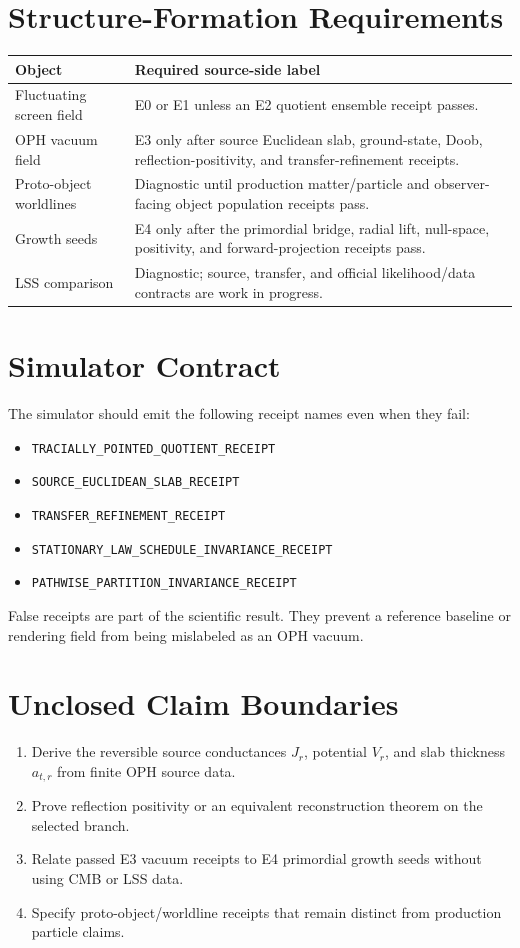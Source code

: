 \documentclass[11pt]{article}
\theoremstyle{remark}
\theoremstyle{plain}
\newcommand{\pathref}[1]{\nolinkurl{#1}}
\begin{document}
\section{Structure-Formation Requirements}

\begin{longtable}{@{}p{}p{}@{}}
\toprule
Object & Required source-side label\\
\midrule
\endhead
\bottomrule
\endfoot
Fluctuating screen field & E0 or E1 unless an E2 quotient ensemble receipt passes.\\
OPH vacuum field & E3 only after source Euclidean slab, ground-state, Doob, reflection-positivity,
and transfer-refinement receipts.\\
Proto-object worldlines & Diagnostic until production matter/particle and observer-facing object
population receipts pass.\\
Growth seeds & E4 only after the primordial bridge, radial lift, null-space, positivity, and
forward-projection receipts pass.\\
LSS comparison & Diagnostic; source, transfer, and official likelihood/data contracts are work in progress.\\
\end{longtable}

\section{Simulator Contract}

The simulator should emit the following receipt names even when they fail:
\begin{itemize}[leftmargin=2em]
\item \pathref{TRACIALLY_POINTED_QUOTIENT_RECEIPT}
\item \pathref{SOURCE_EUCLIDEAN_SLAB_RECEIPT}
\item \pathref{TRANSFER_REFINEMENT_RECEIPT}
\item \pathref{STATIONARY_LAW_SCHEDULE_INVARIANCE_RECEIPT}
\item \pathref{PATHWISE_PARTITION_INVARIANCE_RECEIPT}
\end{itemize}
False receipts are part of the scientific result.  They prevent a reference baseline or rendering
field from being mislabeled as an OPH vacuum.

\section{Unclosed Claim Boundaries}

\begin{enumerate}[leftmargin=2em]
\item Derive the reversible source conductances \(J_r\), potential \(V_r\), and slab thickness
\(a_{t,r}\) from finite OPH source data.
\item Prove reflection positivity or an equivalent reconstruction theorem on the selected branch.
\item Relate passed E3 vacuum receipts to E4 primordial growth seeds without using CMB or LSS data.
\item Specify proto-object/worldline receipts that remain distinct from production particle claims.
\end{enumerate}
\end{document}

